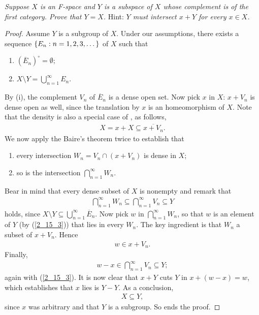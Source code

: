 \textit{%
Suppose $X$ is an F-space and $Y$ is a subspace of $X$ %
whose complement is of the first category. %
Prove that $Y=X$. }Hint: \textit{%
%
  $Y$ must intersect $x+Y$ for every $x\in X$. %
%
}
%
\begin{proof} Assume $Y$ is a subgroup of $X$. %
Under our assumptions, %
there exists a sequence $\{E_n: n=1, 2, 3, \dots\}$ of $X$ such that %
%
  \renewcommand{\labelenumi}{(\roman{enumi})} 
  \begin{enumerate}
    \item ${(\overline{E}_n)}^\circ=\emptyset ;$
    \item $X\setminus Y = \displaystyle{\bigcup_{n=1}^\infty  E_n}$.
  \end{enumerate}
%
By (i), the complement $V_n$ of $\overline{E}_n$ is a dense open set. %
Now pick $x$ in $X$: $x + V_n$ is dense open as well, 
since the translation by $x$ is an homeomorphism of $X$. %
%
Note that the density is also a special case of , as follows, %
%
\begin{align}\label{2_15_2}
  X = x + X \subseteq \overline{x + V_n}.
\end{align} 
%
We now apply the Baire's theorem twice to establish that %
%
\begin{enumerate}
  \item every intersection $W_n = V_n \cap (x+V_n)$ is dense in $X$;
  \item so is the intersection $\displaystyle{\bigcap_{n=1}^\infty W_n}$.
\end{enumerate}
%
Bear in mind that every dense subset of $X$ is nonempty and remark that %
\begin{align}\label{2_15_3}
  \bigcap_{n=1}^\infty W_n \subseteq \bigcap_{n=1}^\infty V_n \subseteq Y
\end{align} 
holds, since %
%
  $X\setminus Y \subseteq \bigcup_{n=1}^\infty \overline{E}_n$. %
%
Now pick $w$ in $\bigcap_{n=1}^\infty W_n$, so that %
$w$ is an element of $Y$ (by (\ref{2_15_3})) that lies in every $W_n$. %
The key ingredient is that $W_n$ a subset of $x + V_n$. %
Hence %
%
\begin{align}
  w \in  x + V_n. 
\end{align}
%
Finally, 
\begin{align}
  w - x \in \bigcap_{n=1}^\infty V_n \subseteq Y; 
\end{align}
%
again with (\ref{2_15_3}).
It is now clear that $x + Y$ cuts $Y$ in $x + (w - x ) = w$, which establishes that $x$ lies is $Y - Y$. %
As a conclusion, 
\begin{align}
  X \subseteq Y,  
\end{align}
%
since $x$ was arbitrary and that $Y$ is a subgroup. %
So ends the proof.
%
%
%
%
\end{proof}
\renewcommand{\labelenumi}{(\alph{enumi})} 
%
